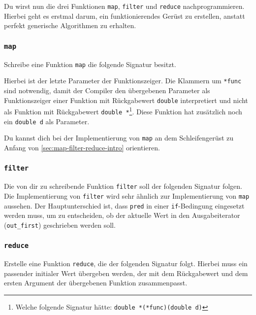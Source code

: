 Du wirst nun die drei Funktionen \lstinline{map}, \lstinline{filter} und \lstinline{reduce} nachprogrammieren.
Hierbei geht es erstmal darum, ein funktionierendes Gerüst zu erstellen, anstatt perfekt generische Algorithmen zu erhalten.

\subsubsection{\lstinline{map}}

Schreibe eine Funktion \lstinline{map} die folgende Signatur besitzt.


Hierbei ist der letzte Parameter der Funktionszeiger.
Die Klammern um \lstinline{*func} sind notwendig, damit der Compiler den übergebenen Parameter als Funktionszeiger einer Funktion mit Rückgabewert \lstinline{double} interpretiert und nicht als Funktion mit Rückgabewert \lstinline{double *}\footnote{Welche folgende Signatur hätte: \lstinline{double *(*func)(double d)}}.
Diese Funktion hat zusätzlich noch ein \lstinline{double d} als Parameter.

Du kannst dich bei der Implementierung von \lstinline|map| an dem Schleifengerüst zu Anfang von \ref{sec:map-filter-reduce-intro} orientieren.

\subsubsection{\lstinline{filter}}

Die von dir zu schreibende Funktion \lstinline{filter} soll der folgenden Signatur folgen.
%
%
Die Implementierung von \lstinline|filter| wird sehr ähnlich zur Implementierung von \lstinline|map| aussehen.
Der Hauptunterschied ist, dass \lstinline|pred| in einer \lstinline|if|-Bedingung eingesetzt werden muss, um zu entscheiden, ob der aktuelle Wert in den Ausgabeiterator (\lstinline|out_first|) geschrieben werden soll.

\subsubsection{\lstinline{reduce}}

Erstelle eine Funktion \lstinline{reduce}, die der folgenden Signatur folgt.
%
%
Hierbei muss ein passender initialer Wert übergeben werden, der mit dem Rückgabewert und dem ersten Argument der übergebenen Funktion zusammenpasst.

